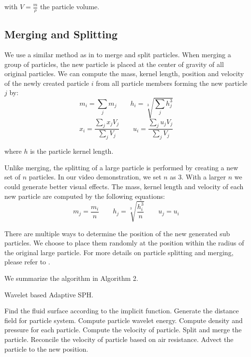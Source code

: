 \noindent with $V=\frac{m}{\rho}$ the particle volume.

\subsection{Merging and Splitting}

We use a similar method as in \cite{Hong:2008:API:1394332.1394340}
to merge and split particles.
When merging a group of particles, the new particle is placed at the center of
gravity of all original particles. We can compute the mass, kernel length,
position and velocity of the newly created particle $i$ from
all particle members forming the new particle $j$ by:
$$m_i=\sum_{j} m_j \quad \quad h_i=\sqrt[3]{\sum_{j}h_j^3}$$
$$x_i=\frac{\sum_{j}x_j V_j}{\sum_{j}V_j} \quad \quad u_i=\frac{\sum_{j}u_j V_j}{\sum_{j}V_j}$$

\noindent where $h$ is the particle kernel length.

Unlike merging, the splitting of a large particle is performed by creating
a new set of $n$ particles. In our video demonstration, we set $n$ as $3$.
With a larger $n$ we could generate better visual effects. The mass, kernel
length and velocity of each new particle are computed by the following
equations:
$$m_j=\frac{m_i}{n} \quad \quad  h_j=\sqrt[3]{\frac{h_i^3}{n}} \quad \quad u_j=u_i$$

There are multiple ways to determine the position of the new generated sub
particles. We choose to place them randomly at the position within the radius
of the original large particle. For more details on particle splitting and
 merging, please refer to \cite{Hong:2008:API:1394332.1394340}.

We summarize the algorithm in Algorithm 2.

\begin{algorithm}[htb]
\caption{Wavelet based Adaptive SPH.}
\begin{algorithmic}[1]
\STATE Find the fluid surface according to the implicit function.
\STATE Generate the distance field for particle system.
\STATE Compute particle wavelet energy.
\STATE Compute density and pressure for each particle.
\STATE Compute the velocity of particle.
\STATE Split and merge the particle.
\STATE Reconcile the velocity of particle based on air resistance.
\STATE Advect the particle to the new position.
\end{algorithmic}
\end{algorithm}

